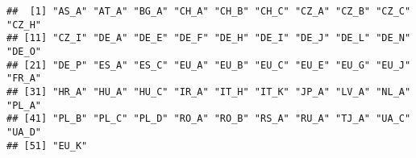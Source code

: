 \documentclass[table]{article}
\begin{document}
\begin{verbatim}
##  [1] "AS_A" "AT_A" "BG_A" "CH_A" "CH_B" "CH_C" "CZ_A" "CZ_B" "CZ_C" "CZ_H"
## [11] "CZ_I" "DE_A" "DE_E" "DE_F" "DE_H" "DE_I" "DE_J" "DE_L" "DE_N" "DE_O"
## [21] "DE_P" "ES_A" "ES_C" "EU_A" "EU_B" "EU_C" "EU_E" "EU_G" "EU_J" "FR_A"
## [31] "HR_A" "HU_A" "HU_C" "IR_A" "IT_H" "IT_K" "JP_A" "LV_A" "NL_A" "PL_A"
## [41] "PL_B" "PL_C" "PL_D" "RO_A" "RO_B" "RS_A" "RU_A" "TJ_A" "UA_C" "UA_D"
## [51] "EU_K"
\end{verbatim}
\end{document}
